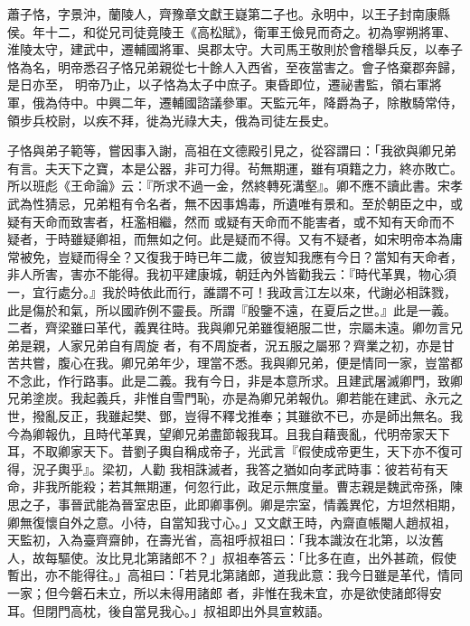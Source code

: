 
\begin{pinyinscope}

 蕭子恪，字景沖，蘭陵人，齊豫章文獻王嶷第二子也。永明中，以王子封南康縣侯。年十二，和從兄司徒竟陵王《高松賦》，衛軍王儉見而奇之。初為寧朔將軍、淮陵太守，建武中，遷輔國將軍、吳郡太守。大司馬王敬則於會稽舉兵反，以奉子恪為名，明帝悉召子恪兄弟親從七十餘人入西省，至夜當害之。會子恪棄郡奔歸，是日亦至，
 明帝乃止，以子恪為太子中庶子。東昏即位，遷祕書監，領右軍將軍，俄為侍中。中興二年，遷輔國諮議參軍。天監元年，降爵為子，除散騎常侍，領步兵校尉，以疾不拜，徙為光祿大夫，俄為司徒左長史。



 子恪與弟子範等，嘗因事入謝，高祖在文德殿引見之，從容謂曰：「我欲與卿兄弟有言。夫天下之寶，本是公器，非可力得。茍無期運，雖有項籍之力，終亦敗亡。所以班彪《王命論》云：『所求不過一金，然終轉死溝壑』。卿不應不讀此書。宋孝武為性猜忌，兄弟粗有令名者，無不因事鴆毒，所遺唯有景和。至於朝臣之中，或疑有天命而致害者，枉濫相繼，然而
 或疑有天命而不能害者，或不知有天命而不疑者，于時雖疑卿祖，而無如之何。此是疑而不得。又有不疑者，如宋明帝本為庸常被免，豈疑而得全？又復我于時已年二歲，彼豈知我應有今日？當知有天命者，非人所害，害亦不能得。我初平建康城，朝廷內外皆勸我云：『時代革異，物心須一，宜行處分。』我於時依此而行，誰謂不可！我政言江左以來，代謝必相誅戮，此是傷於和氣，所以國祚例不靈長。所謂『殷鑒不遠，在夏后之世。』此是一義。二者，齊梁雖曰革代，義異往時。我與卿兄弟雖復絕服二世，宗屬未遠。卿勿言兄弟是親，人家兄弟自有周旋
 者，有不周旋者，況五服之屬邪？齊業之初，亦是甘苦共嘗，腹心在我。卿兄弟年少，理當不悉。我與卿兄弟，便是情同一家，豈當都不念此，作行路事。此是二義。我有今日，非是本意所求。且建武屠滅卿門，致卿兄弟塗炭。我起義兵，非惟自雪門恥，亦是為卿兄弟報仇。卿若能在建武、永元之世，撥亂反正，我雖起樊、鄧，豈得不釋戈推奉；其雖欲不已，亦是師出無名。我今為卿報仇，且時代革異，望卿兄弟盡節報我耳。且我自藉喪亂，代明帝家天下耳，不取卿家天下。昔劉子輿自稱成帝子，光武言『假使成帝更生，天下亦不復可得，況子輿乎』。梁初，人勸
 我相誅滅者，我答之猶如向孝武時事：彼若茍有天命，非我所能殺；若其無期運，何忽行此，政足示無度量。曹志親是魏武帝孫，陳思之子，事晉武能為晉室忠臣，此即卿事例。卿是宗室，情義異佗，方坦然相期，卿無復懷自外之意。小待，自當知我寸心。」又文獻王時，內齋直帳閹人趙叔祖，天監初，入為臺齊齋帥，在壽光省，高祖呼叔祖曰：「我本識汝在北第，以汝舊人，故每驅使。汝比見北第諸郎不？」叔祖奉答云：「比多在直，出外甚疏，假使暫出，亦不能得往。」高祖曰：「若見北第諸郎，道我此意：我今日雖是革代，情同一家；但今磐石未立，所以未得用諸郎
 者，非惟在我未宜，亦是欲使諸郎得安耳。但閉門高枕，後自當見我心。」叔祖即出外具宣敕語。




\end{pinyinscope}

